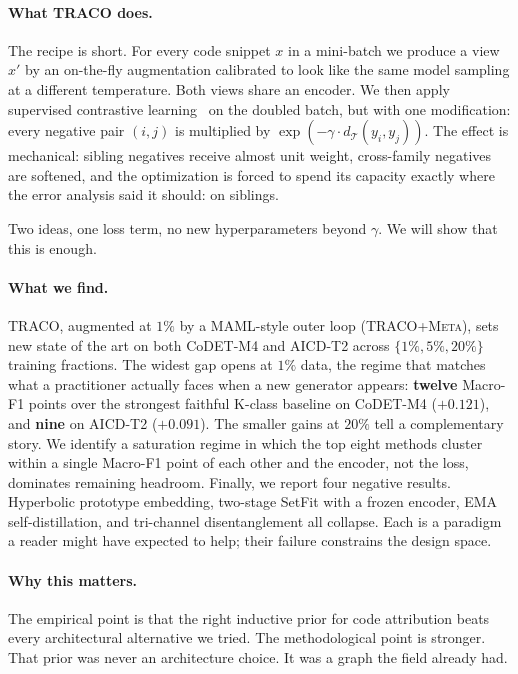 ﻿\documentclass[11pt]{article}
\newcommand{\method}{\textsc{TRACO}\xspace}
\begin{document}
\paragraph{What \method does.} The recipe is short. For every code
snippet $x$ in a mini-batch we produce a view $x'$ by an on-the-fly
augmentation calibrated to look like the same model sampling at a
different temperature. Both views share an encoder. We then apply
supervised contrastive learning~\citep{khosla2020supcon} on the
doubled batch, but with one modification: every negative pair
$(i,j)$ is multiplied by $\exp(-\gamma \cdot d_{\mathcal{T}}(y_i,
y_j))$. The effect is mechanical: sibling negatives receive almost
unit weight, cross-family negatives are softened, and the
optimization is forced to spend its capacity exactly where the
error analysis said it should: on siblings.

Two ideas, one loss term, no new hyperparameters beyond $\gamma$. We
will show that this is enough.

\paragraph{What we find.} \method, augmented at $1\%$ by a
MAML-style outer loop (\method+\textsc{Meta}), sets new state of
the art on both CoDET-M4 and AICD-T2 across $\{1\%, 5\%, 20\%\}$
training fractions. The widest gap opens at $1\%$ data, the regime
that matches what a practitioner actually faces when a new
generator appears: \textbf{twelve} Macro-F1 points over the
strongest faithful K-class baseline on CoDET-M4 ($+0.121$), and
\textbf{nine} on AICD-T2 ($+0.091$). The smaller gains at $20\%$
tell a complementary story. We identify a saturation regime in
which the top eight methods cluster within a single Macro-F1 point
of each other and the encoder, not the loss, dominates remaining
headroom. Finally, we report four negative results. Hyperbolic
prototype embedding, two-stage SetFit with a frozen encoder, EMA
self-distillation, and tri-channel disentanglement all collapse.
Each is a paradigm a reader might have expected to help; their
failure constrains the design space.

\paragraph{Why this matters.} The empirical point is that the right
inductive prior for code attribution beats every architectural
alternative we tried. The methodological point is stronger. That
prior was never an architecture choice. It was a graph the field
already had.
\end{document}
